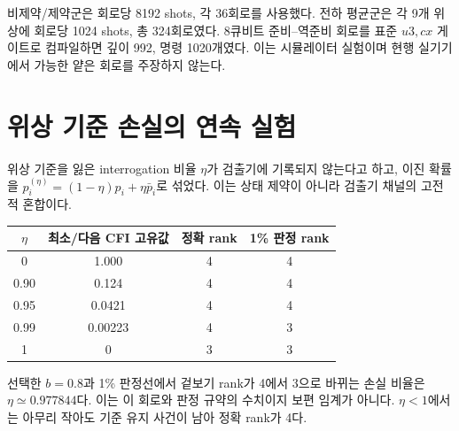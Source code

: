 \documentclass[11pt,a4paper]{article}
\begin{document}
비제약/제약군은 회로당 8192 shots, 각 36회로를 사용했다.
전하 평균군은 각 9개 위상에 회로당 1024 shots, 총 324회로였다.
8큐비트 준비--역준비 회로를 표준 $u3,cx$ 게이트로 컴파일하면
깊이 992, 명령 1020개였다. 이는 시뮬레이터 실험이며 현행
실기기에서 가능한 얕은 회로를 주장하지 않는다.

\section{위상 기준 손실의 연속 실험}
위상 기준을 잃은 interrogation 비율 $\eta$가 검출기에 기록되지
않는다고 하고, 이진 확률을
$p_i^{(\eta)}=(1-\eta)p_i+\eta\bar p_i$로 섞었다.
이는 상태 제약이 아니라 검출기 채널의 고전적 혼합이다.
\begin{center}
\begin{tabular}{@{}cccc@{}}
\toprule
$\eta$ & 최소/다음 CFI 고유값 & 정확 rank & 1\% 판정 rank \\
\midrule
0 & 1.000 & 4 & 4 \\
0.90 & 0.124 & 4 & 4 \\
0.95 & 0.0421 & 4 & 4 \\
0.99 & 0.00223 & 4 & 3 \\
1 & 0 & 3 & 3 \\
\bottomrule
\end{tabular}
\end{center}
선택한 $b=0.8$과 1\% 판정선에서 겉보기 rank가 4에서 3으로
바뀌는 손실 비율은 $\eta\simeq0.977844$다. 이는 이 회로와
판정 규약의 수치이지 보편 임계가 아니다. $\eta<1$에서는
아무리 작아도 기준 유지 사건이 남아 정확 rank가 4다.
\end{document}
